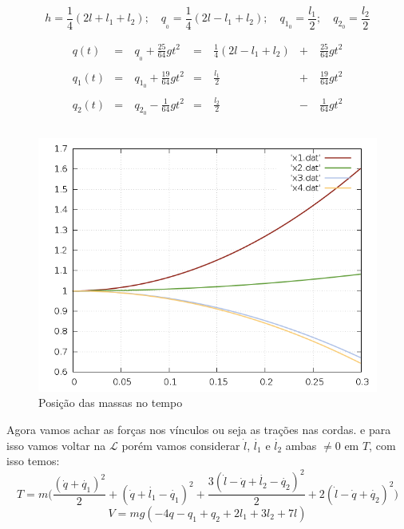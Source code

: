 \documentclass[a4paper,12pt]{exam}
\begin{document}
	\[h = \frac{1}{4}(2l +l_1 + l_2); \quad q_{_0} = \frac{1}{4} (2l-l_1+l_2); \quad q_{1_0} = \frac{l_1}{2}; \quad q_{2_0} = \frac{l_2}{2} \]
	
	\[
	\begin{array}{lclcccl}
	q(t) &=& q_{_0} + \frac{25}{64}gt^2 & = & \frac{1}{4} (2l-l_1+l_2) &+& \frac{25}{64}gt^2\\ \quad & \quad & \quad & \quad & \quad & \quad& \quad\\
	q_1(t) &=& q_{1_0} + \frac{19}{64}gt^2 & = & \frac{l_1}{2} &+& \frac{19}{64}gt^2\\ \quad & \quad & \quad & \quad & \quad & \quad& \quad\\
	q_2(t) &=& q_{2_0} - \frac{1}{64}gt^2 & = & \frac{l_2}{2} &-& \frac{1}{64}gt^2\\ \quad & \quad & \quad & \quad & \quad  & \quad& \quad\\
	
	\end{array}
	\]
	
	\begin{figure}[h]
		\centering
		\includegraphics[scale=0.5]{Graph1.png}
		\caption{Posição das massas no tempo}
	\end{figure}
	Agora vamos achar as forças nos vínculos ou seja as trações nas cordas.
	e para isso vamos voltar na $\mathcal{L}$ porém vamos considerar  $\dot{l}$, $ \dot{l_1}$ e $\dot{l_2}$ ambas $\neq 0$ em $T$, com isso temos:
	\[ T = m \Big(\frac{(\dot{q}+\dot{q_1})^2}{2} + ( \dot{q}+\dot{l_1} - \dot{q_1})^2 + \frac{3(\dot{l}-\dot{q}+\dot{l_2}-\dot{q_2})^2}{2} + 2(\dot{l}- \dot{q}+\dot{q_2})^2 \Big) \]
	\[ V = mg( -4q -q_1 + q_2 + 2l_1 + 3l_2 + 7l )\]
	
\end{document}
